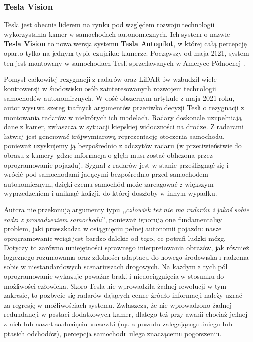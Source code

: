 \subsubsection{Tesla Vision}
Tesla jest obecnie liderem na rynku pod względem rozwoju technologii wykorzystania kamer w samochodach autonomicznych. Ich system o nazwie 
\textbf{Tesla Vision} to nowa wersja systemu \textbf{Tesla Autopilot}, w której całą percepcję oparto tylko na jednym typie czujnika: kamerze. Począwszy od maja 2021, system ten jest montowany w samochodach Tesli sprzedawanych w Ameryce Północnej \cite{tesla:transToVision}.

Pomysł całkowitej rezygnacji z radarów oraz LiDAR-ów wzbudził wiele kontrowersji w środowisku osób zainteresowanych rozwojem technologii samochodów autonomicznych. W dość obszernym artykule \cite{torchinsky:teslaRemoveRadar} z maja 2021 roku, autor wysuwa szereg trafnych argumentów przeciwko decyzji Tesli o rezygnacji z montowania radarów w niektórych ich modelach. Radary doskonale uzupełniają dane z kamer, zwłaszcza w sytuacji kiepskiej widoczności na drodze. Z radarami łatwiej jest generować trójwymiarową reprezentację otoczenia samochodu, ponieważ uzyskujemy ją bezpośrednio z odczytów radaru (w przeciwieństwie do obrazu z kamery, gdzie informacja o głębi musi zostać obliczona przez oprogramowanie pojazdu). Sygnał z radarów jest w stanie prześlizgnąć się i wrócić pod samochodami jadącymi bezpośrednio przed samochodem autonomicznym, dzięki czemu samochód może zareagować z większym wyprzedzeniem i uniknąć kolizji, do której doszłoby w innym wypadku.

Autora nie przekonują argumenty typu ,,\textit{człowiek też nie ma radarów i jakoś sobie radzi z prowadzeniem samochodu}'', ponieważ ignorują one fundamentalny problem, jaki przeszkadza w osiągnięciu pełnej autonomii pojazdu: nasze oprogramowanie wciąż jest bardzo dalekie od tego, co potrafi ludzki mózg. Dotyczy to zarówno umiejętności sprawnego interpretowania obrazów, jak również logicznego rozumowania oraz zdolności adaptacji do nowego środowiska i radzenia sobie w niestandardowych scenariuszach drogowych. Na każdym z tych pól oprogramowanie wykazuje poważne braki i niedociągnięcia w stosunku do możliwości człowieka. Skoro Tesla nie wprowadziła żadnej rewolucji w tym zakresie, to pozbycie się radarów dających cenne źródło informacji należy uznać za regresję w możliwościach systemu. Zwłaszcza, że nie wprowadzono żadnej redundancji w postaci dodatkowych kamer, dlatego też przy awarii chociaż jednej z nich lub nawet zasłonięciu soczewki (np. z powodu zalegającego śniegu lub ptasich odchodów), percepcja samochodu ulega znaczącemu pogorszeniu.

